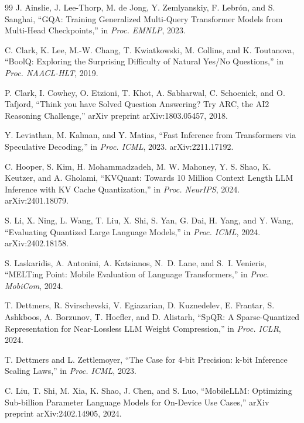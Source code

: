 \documentclass[conference]{IEEEtran}
\begin{document}
\begin{thebibliography}{99}
J. Ainslie, J. Lee-Thorp, M. de Jong, Y. Zemlyanskiy, F. Lebr{\'o}n, and S. Sanghai,
``GQA: Training Generalized Multi-Query Transformer Models from Multi-Head Checkpoints,''
in \textit{Proc. EMNLP}, 2023.

C. Clark, K. Lee, M.-W. Chang, T. Kwiatkowski, M. Collins, and K. Toutanova,
``BoolQ: Exploring the Surprising Difficulty of Natural Yes/No Questions,''
in \textit{Proc. NAACL-HLT}, 2019.

P. Clark, I. Cowhey, O. Etzioni, T. Khot, A. Sabharwal, C. Schoenick, and O. Tafjord,
``Think you have Solved Question Answering? Try ARC, the AI2 Reasoning Challenge,''
arXiv preprint arXiv:1803.05457, 2018.

Y. Leviathan, M. Kalman, and Y. Matias,
``Fast Inference from Transformers via Speculative Decoding,''
in \textit{Proc. ICML}, 2023. arXiv:2211.17192.

C. Hooper, S. Kim, H. Mohammadzadeh, M. W. Mahoney, Y. S. Shao, K. Keutzer, and A. Gholami,
``KVQuant: Towards 10 Million Context Length LLM Inference with KV Cache Quantization,''
in \textit{Proc. NeurIPS}, 2024. arXiv:2401.18079.

S. Li, X. Ning, L. Wang, T. Liu, X. Shi, S. Yan, G. Dai, H. Yang, and Y. Wang,
``Evaluating Quantized Large Language Models,''
in \textit{Proc. ICML}, 2024. arXiv:2402.18158.


S. Laskaridis, A. Antonini, A. Katsianos, N.~D. Lane, and S.~I. Venieris,
``MELTing Point: Mobile Evaluation of Language Transformers,''
in \textit{Proc. MobiCom}, 2024.

T. Dettmers, R. Svirschevski, V. Egiazarian, D. Kuznedelev, E. Frantar,
S. Ashkboos, A. Borzunov, T. Hoefler, and D. Alistarh,
``SpQR: A Sparse-Quantized Representation for Near-Lossless LLM Weight Compression,''
in \textit{Proc. ICLR}, 2024.

T. Dettmers and L. Zettlemoyer,
``The Case for 4-bit Precision: k-bit Inference Scaling Laws,''
in \textit{Proc. ICML}, 2023.

C. Liu, T. Shi, M. Xia, K. Shao, J. Chen, and S. Luo,
``MobileLLM: Optimizing Sub-billion Parameter Language Models for On-Device Use Cases,''
arXiv preprint arXiv:2402.14905, 2024.


\end{thebibliography}
\end{document}

